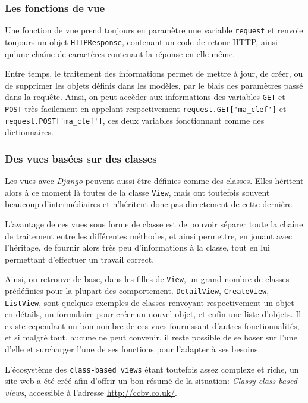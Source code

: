 \documentclass[a4paper]{report}
\begin{document}
\subsubsection{Les fonctions de vue}
\label{ssub:Les fonctions de vue}
\par Une fonction de vue prend toujours en paramètre une variable \verb#request# et renvoie toujours un objet
\verb#HTTPResponse#, contenant un code de retour HTTP, ainsi qu'une chaîne de caractères contenant la réponse en elle
même.
\par Entre temps, le traitement des informations permet de mettre à jour, de créer, ou de supprimer les objets définis
dans les modèles, par le biais des paramètres passé dans la requête. Ainsi, on peut accèder aux informations des
variables \verb#GET# et \verb#POST# très facilement en appelant respectivement \verb#request.GET['ma_clef']# et
\verb#request.POST['ma_clef']#, ces deux variables fonctionnant comme des dictionnaires.

\subsubsection{Des vues basées sur des classes}
\label{ssub:Des vues basées sur des classes}
\par Les vues avec \emph{Django} peuvent aussi être définies comme des classes. Elles héritent alors à ce moment là
toutes de la classe \verb#View#, mais ont toutefois souvent beaucoup d'intermédiaires et n'héritent donc pas directement
de cette dernière.
\par L'avantage de ces vues sous forme de classe est de pouvoir séparer toute la chaîne de traitement entre les
différentes méthodes, et ainsi permettre, en jouant avec l'héritage, de fournir alors très peu d'informations à la
classe, tout en lui permettant d'effectuer un travail correct.
\par Ainsi, on retrouve de base, dans les filles de \verb#View#, un grand nombre de classes prédéfinies pour la plupart
des comportement. \verb#DetailView#, \verb#CreateView#, \verb#ListView#, sont quelques exemples de classes renvoyant
respectivement un objet en détails, un formulaire pour créer un nouvel objet, et enfin une liste d'objets. Il existe
cependant un bon nombre de ces vues fournissant d'autres fonctionnalités, et si malgré tout, aucune ne peut convenir, il
reste possible de se baser sur l'une d'elle et surcharger l'une de ses fonctions pour l'adapter à ses besoins.
\par L'écosystème des \verb#class-based views# étant toutefois assez complexe et riche, un site web a été créé afin
d'offrir un bon résumé de la situation: \emph{Classy class-based views}, accessible à l'adresse
\url{http://ccbv.co.uk/}.
\end{document}

